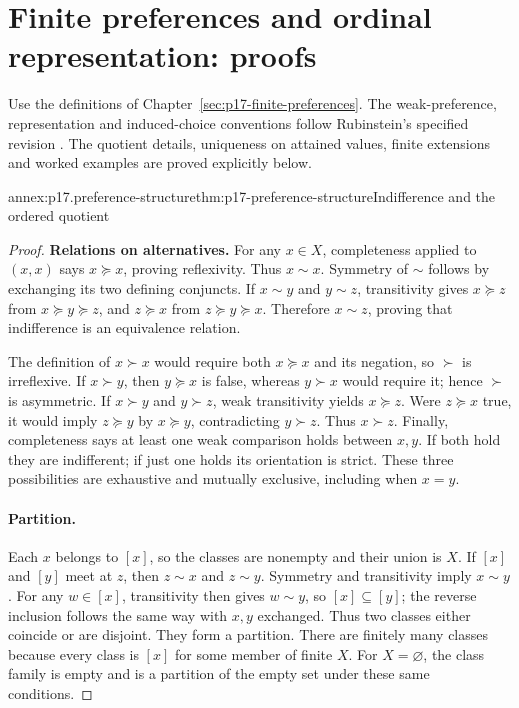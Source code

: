 \section{Finite preferences and ordinal representation: proofs}
\label{sec:annex-p17-finite-preferences}

Use the definitions of Chapter~\ref{sec:p17-finite-preferences}. The
weak-preference, representation and induced-choice conventions follow
Rubinstein's specified revision
\cite[2015 revision, pp.~5--8, 12--14 and 31]{Rubinstein2015LectureNotes}.
The quotient details, uniqueness on attained values, finite extensions and
worked examples are proved explicitly below.

\begin{annexitem}{annex:p17.preference-structure}{thm:p17-preference-structure}{Indifference and the ordered quotient}
\begin{proof}
\textbf{Relations on alternatives.}\enspace
For any \(x\in X\), completeness applied to \((x,x)\) says
\(x\succeq x\), proving reflexivity. Thus \(x\sim x\).
Symmetry of \(\sim\) follows by exchanging its two defining conjuncts.
If \(x\sim y\) and \(y\sim z\), transitivity gives
\(x\succeq z\) from \(x\succeq y\succeq z\), and
\(z\succeq x\) from \(z\succeq y\succeq x\). Therefore
\(x\sim z\), proving that indifference is an equivalence relation.

The definition of \(x\succ x\) would require both \(x\succeq x\)
and its negation, so \(\succ\) is irreflexive. If \(x\succ y\),
then \(y\succeq x\) is false, whereas \(y\succ x\) would require
it; hence \(\succ\) is asymmetric. If \(x\succ y\) and
\(y\succ z\), weak transitivity yields \(x\succeq z\).
Were \(z\succeq x\) true, it would imply \(z\succeq y\) by
\(x\succeq y\), contradicting \(y\succ z\). Thus \(x\succ z\).
Finally, completeness says at least one weak comparison holds between
\(x,y\). If both hold they are indifferent; if just one holds its
orientation is strict. These three possibilities are exhaustive and
mutually exclusive, including when \(x=y\).

\paragraph{Partition.}
Each \(x\) belongs to \([x]\), so the classes are nonempty and their
union is \(X\). If \([x]\) and \([y]\) meet at \(z\), then
\(z\sim x\) and \(z\sim y\). Symmetry and transitivity imply
\(x\sim y\). For any \(w\in[x]\), transitivity then gives
\(w\sim y\), so \([x]\subseteq[y]\); the reverse inclusion follows
the same way with \(x,y\) exchanged. Thus two classes either coincide
or are disjoint. They form a partition. There are finitely many classes
because every class is \([x]\) for some member of finite \(X\).
For \(X=\varnothing\), the class family is empty and is a partition
of the empty set under these same conditions.


\end{proof}
\end{annexitem}
